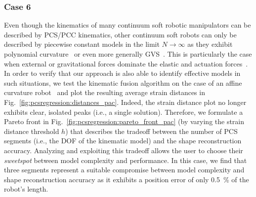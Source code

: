 
\subsubsection{Case 6}
Even though the kinematics of many continuum soft robotic manipulators can be described by \gls{PCS}/\gls{PCC} kinematics, other continuum soft robots can only be described by piecewise constant models in the limit $N \to \infty$ as they exhibit polynomial curvature~\citep{della2019control, stella2022experimental} or even more generally \gls{GVS}~\citep{boyer2020dynamics}.
This is particularly the case when external or gravitational forces dominate the elastic and actuation forces~\citep{della2023model}.
In order to verify that our approach is also able to identify effective models in such situations, we test the kinematic fusion algorithm on the case of an affine curvature robot~\citep{stella2023piecewise} and plot the resulting average strain distances in Fig.~\ref{fig:pcsregression:distances_pac}.
Indeed, the strain distance plot no longer exhibits clear, isolated peaks (i.e., a single solution). Therefore, we formulate a Pareto front in Fig.~\ref{fig:pcsregression:pareto_front_pac} (by varying the strain distance threshold $h$) that describes the tradeoff between the number of \gls{PCS} segments (i.e., the \gls{DOF} of the kinematic model) and the shape reconstruction accuracy. Analyzing and exploiting this tradeoff allows the user to choose their \emph{sweetspot} between model complexity and performance.
In this case, we find that three segments represent a suitable compromise between model complexity and shape reconstruction accuracy as it exhibits a position error of only \SI{0.5}{\percent} of the robot's length.



